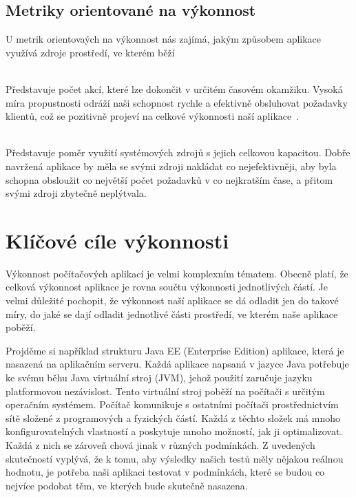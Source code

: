 \documentclass[122pt,oneside]{fithesis}
\begin{document}
\subsection{Metriky orientované na výkonnost}
U metrik orientovaých na výkonnost nás zajímá, jakým způsobem aplikace využívá zdroje prostředí, ve kterém běží

\vspace{5 mm}
\\\indent Představuje počet akcí, které lze dokončit v určitém časovém okamžiku. Vysoká míra propustnosti odráží naši schopnost rychle a efektivně obsluhovat požadavky klientů, což se pozitivně projeví na celkové výkonnosti naší aplikace~\cite{haines06}.

\vspace{5 mm}
\\\indent Představuje poměr využití systémových zdrojů s jejich celkovou kapacitou. Dobře navržená aplikace by měla se svými zdroji nakládat co nejefektivněji, aby byla schopna obsloužit co největší počet požadavků v co nejkratším čase, a přitom svými zdroji zbytečně neplýtvala.

\section{Klíčové cíle výkonnosti}
Výkonnost počítačových aplikací je velmi komplexním tématem. Obecně platí, že celková výkonnost aplikace je rovna součtu výkonnosti jednotlivých částí. Je velmi důležité pochopit, že výkonnost naší aplikace se dá odladit jen do takové míry, do jaké se dají odladit jednotlivé části prostředí, ve kterém naše aplikace poběží. 

Projděme si například strukturu Java EE (Enterprise Edition) aplikace, která je nasazená na aplikačním serveru. Každá aplikace napsaná v jazyce Java potřebuje ke svému běhu Java virtuální stroj (JVM), jehož použití zaručuje jazyku platformovou nezávislost. Tento virtuální stroj poběží na počítači s určitým operačním systémem. Počítač komunikuje s ostatními počítači prostřednictvím sítě složené z programových a fyzických částí. Každá z těchto složek má mnoho konfigurovatelných vlastností a poskytuje mnoho možností, jak ji optimalizovat. Každá z nich se zároveň chová jinak v různých podmínkách. Z uvedených skutečností vyplývá, že k tomu, aby výsledky našich testů měly nějakou reálnou hodnotu, je potřeba naši aplikaci testovat v podmínkách, které se budou co nejvíce podobat těm, ve kterých bude skutečně nasazena.
\end{document}
